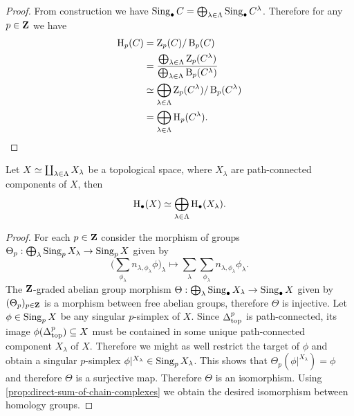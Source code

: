 \begin{proof}
    From construction we have
    \(\operatorname{Sing}_{\bullet} C = \bigoplus_{\lambda \in \Lambda} \operatorname{Sing}_{\bullet}
    C^{\lambda}\). Therefore for any \(p \in \mathbf{Z}\) we have
    \begin{align*}
        \operatorname{H}_p(C)
         & = \operatorname{Z}_p(C)/\operatorname{B}_p(C)                                                        \\
         & = \frac{\bigoplus_{\lambda \in
                \Lambda}\operatorname{Z}_p(C^{\lambda})}{\bigoplus_{\lambda \in \Lambda}\operatorname{B}_p(C^{\lambda})}
        \\
         & \simeq \bigoplus_{\lambda \in \Lambda} \operatorname{Z}_p(C^{\lambda})/\operatorname{B}_p(C^{\lambda}) \\
         & = \bigoplus_{\lambda \in \Lambda} \operatorname{H}_p(C^{\lambda}).
    \end{align*}
\end{proof}

\begin{proposition}
    \label{prop:coprod-space-decomposition-homology-group}
    Let \(X \simeq \coprod_{\lambda \in \Lambda} X_{\lambda}\) be a topological
    space, where \(X_{\lambda}\) are path-connected components of \(X\), then
    \[
        \operatorname{H}_{\bullet}(X) \simeq \bigoplus_{\lambda \in \Lambda} \operatorname{H}_{\bullet}(X_{\lambda}).
    \]
\end{proposition}

\begin{proof}
    For each \(p \in \mathbf{Z}\) consider the morphism of groups
    \(\Theta_p: \bigoplus_{\lambda} \operatorname{Sing}_p X_{\lambda} \to \operatorname{Sing}_p X\) given by
    \[
        \Big( \sum_{\phi_{\lambda}} n_{\lambda, \phi_{\lambda}} \phi \Big)_{\lambda}
        \longmapsto
        \sum_{\lambda} \sum_{\phi_{\lambda}} n_{\lambda, \phi_{\lambda}} \phi_{\lambda}.
    \]
    The \(\mathbf{Z}\)-graded abelian group morphism
    \(\Theta: \bigoplus_{\lambda} \operatorname{Sing}_{\bullet} X_{\lambda} \to \operatorname{Sing}_{\bullet}
    X\) given by \((\Theta_p)_{p \in \mathbf{Z}}\) is a morphism between free abelian
    groups, therefore \(\Theta\) is injective. Let \(\phi \in \operatorname{Sing}_p X\) be any
    singular \(p\)-simplex of \(X\). Since \(\Delta_{\text{top}}^p\) is path-connected, its
    image \(\phi(\Delta_{\text{top}}^p) \subseteq X\) must be contained in some unique
    path-connected component \(X_{\lambda}\) of \(X\). Therefore we might as well
    restrict the target of \(\phi\) and obtain a singular \(p\)-simplex
    \(\phi|^{X_{\lambda}} \in \operatorname{Sing}_p X_{\lambda}\). This shows that \(\Theta_p(\phi|^{X_{\lambda}}) = \phi\) and
    therefore \(\Theta\) is a surjective map. Therefore \(\Theta\) is an isomorphism. Using
    \cref{prop:direct-sum-of-chain-complexes} we obtain the desired isomorphism
    between homology groups.
\end{proof}

